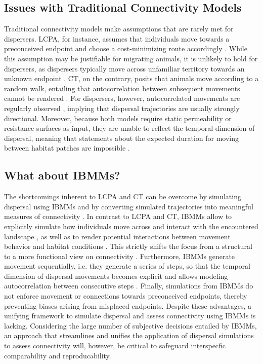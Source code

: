 \documentclass[abstract=on,10pt,a4paper,bibliography=totocnumbered]{article}
\begin{document}
\subsection{Issues with Traditional Connectivity Models}
Traditional connectivity models make assumptions that are rarely met for
dispersers. LCPA, for instance, assumes that individuals move towards a
preconceived endpoint and choose a cost-minimizing route accordingly
\citep{Sawyer.2011, Abrahms.2017}. While this assumption may be justifiable for
migrating animals, it is unlikely to hold for dispersers, as dispersers
typically move across unfamiliar territory towards an unknown endpoint
\citep{Koen.2014, Cozzi.2020}. CT, on the contrary, posits that animals move
according to a random walk, entailing that autocorrelation between subsequent
movements cannot be rendered \citep{Diniz.2019}. For dispersers, however,
autocorrelated movements are regularly observed \citep{Cozzi.2020,
Hofmann.2021}, implying that dispersal trajectories are usually strongly
directional. Moreover, because both models require static permeability or
resistance surfaces as input, they are unable to reflect the temporal dimension
of dispersal, meaning that statements about the expected duration for moving
between habitat patches are impossible \citep{Martensen.2017, Diniz.2019}.

\subsection{What about IBMMs?}
The shortcomings inherent to LCPA and CT can be overcome by simulating dispersal
using IBMMs and by converting simulated trajectories into meaningful measures of
connectivity \citep{Diniz.2019}. In contrast to LCPA and CT, IBMMs allow to
explicitly simulate how individuals move across and interact with the
encountered landscape \citep{Kanagaraj.2013, Clark.2015, Allen.2016,
Hauenstein.2019, Zeller.2020}, as well as to render potential interactions
between movement behavior and habitat conditions \citep{Avgar.2016}. This
strictly shifts the focus from a structural to a more functional view on
connectivity \citep{Tischendorf.2000, Kanagaraj.2013, Hauenstein.2019}.
Furthermore, IBMMs generate movement sequentially, i.e. they generate a series
of steps, so that the temporal dimension of dispersal movements becomes explicit
and allows modeling autocorrelation between consecutive steps
\citep{Diniz.2019}. Finally, simulations from IBMMs do not enforce movement or
connections towards preconceived endpoints, thereby preventing biases arising
from misplaced endpoints. Despite these advantages, a unifying framework to
simulate dispersal and assess connectivity using IBMMs is lacking. Considering
the large number of subjective decisions entailed by IBMMs, an approach that
streamlines and unifies the application of dispersal simulations to assess
connectivity will, however, be critical to safeguard interspecfic comparability
and reproducability.
\end{document}
